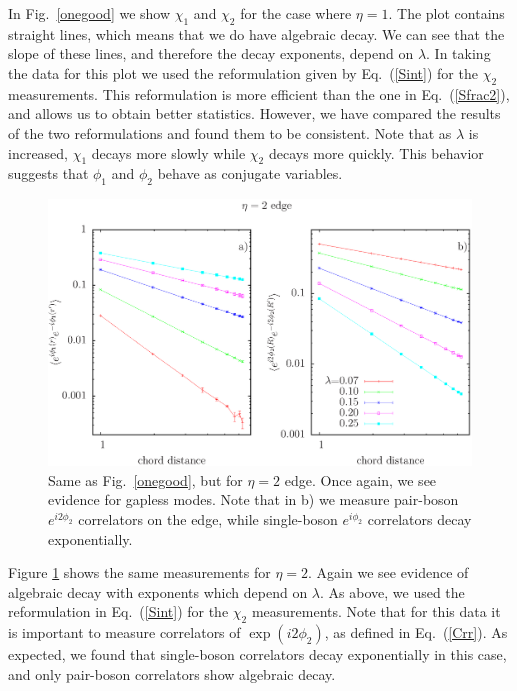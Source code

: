 In Fig.~\ref{onegood} we show $\chi_1$ and $\chi_2$ for the case where $\eta=1$. The plot contains straight lines, which means that we do have algebraic decay. We can see that the slope of these lines, and therefore the decay exponents, depend on $\lambda$. In taking the data for this plot we used the reformulation given by Eq.~(\ref{Sint}) for the $\chi_2$ measurements. This reformulation is more efficient than the one in Eq.~(\ref{Sfrac2}), and allows us to obtain better statistics. However, we have compared the results of the two reformulations and found them to be consistent. Note that as $\lambda$ is increased, $\chi_1$ decays more slowly while $\chi_2$ decays more quickly. This behavior suggests that $\phi_1$ and $\phi_2$ behave as conjugate variables.

\begin{figure}
\includegraphics[width=\linewidth]{figures/twocord.eps}
\caption{ Same as Fig.~\ref{onegood}, but for $\eta=2$ edge. Once again, we see evidence for gapless modes. Note that in b) we measure pair-boson $e^{i 2\phi_2}$ correlators on the edge, while single-boson $e^{i\phi_2}$ correlators decay exponentially.
\label{twogood}}
\end{figure}

Figure \ref{twogood} shows the same measurements for $\eta=2$. Again we see evidence of algebraic decay with exponents which depend on $\lambda$. As above, we used the reformulation in Eq.~(\ref{Sint}) for the $\chi_2$ measurements. Note that for this data it is important to measure correlators of $\exp(i2\phi_2)$, as defined in Eq.~(\ref{Crr}). As expected, we found that single-boson correlators decay exponentially in this case, and only pair-boson correlators show algebraic decay.


